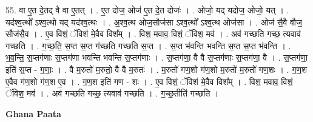 \documentclass[17pt]{extarticle}
\begin{document}
55. वा ए॒त दे॒तद् वै वा ए॒तत् । . ए॒त दोज॒ ओज॑ ए॒त दे॒त दोजः॑ । . ओजो॒ यद् यदोज॒ ओजो॒ यत् । . यद॑श्व॒त्थो᳚ ऽश्व॒त्थो यद् यद॑श्व॒त्थः । . अ॒श्व॒त्थ ओज॒सौज॑सा ऽश्व॒त्थो᳚ ऽश्व॒त्थ ओज॑सा । . ओज॑ सै॒वै वौज॒ सौज॑सै॒व । . ए॒व विशं॒ ॅविश॑ मे॒वैव विश᳚म् । . विश॒ मवाव॒ विशं॒ ॅविश॒ मव॑ । . अव॑ गच्छति गच्छ॒ त्यवाव॑ गच्छति । . ग॒च्छ॒ति॒ स॒प्त स॒प्त ग॑च्छति गच्छति स॒प्त । . स॒प्त भ॑वन्ति भवन्ति स॒प्त स॒प्त भ॑वन्ति । . भ॒व॒न्ति॒ स॒प्तग॑णाः स॒प्तग॑णा भवन्ति भवन्ति स॒प्तग॑णाः । . स॒प्तग॑णा॒ वै वै स॒प्तग॑णाः स॒प्तग॑णा॒ वै । . स॒प्तग॑णा॒ इति॑ स॒प्त - ग॒णाः॒ । . वै म॒रुतो॑ म॒रुतो॒ वै वै म॒रुतः॑ । . म॒रुतो॑ गण॒शो ग॑ण॒शो म॒रुतो॑ म॒रुतो॑ गण॒शः । . ग॒ण॒श ए॒वैव ग॑ण॒शो ग॑ण॒श ए॒व । . ग॒ण॒श इति॑ गण - शः । . ए॒व विशं॒ ॅविश॑ मे॒वैव विश᳚म् । . विश॒ मवाव॒ विशं॒ ॅविश॒ मव॑ । . अव॑ गच्छति गच्छ॒ त्यवाव॑ गच्छति । . ग॒च्छ॒तीति॑ गच्छति । \newline

\textbf{Ghana Paata } \newline
\end{document}
